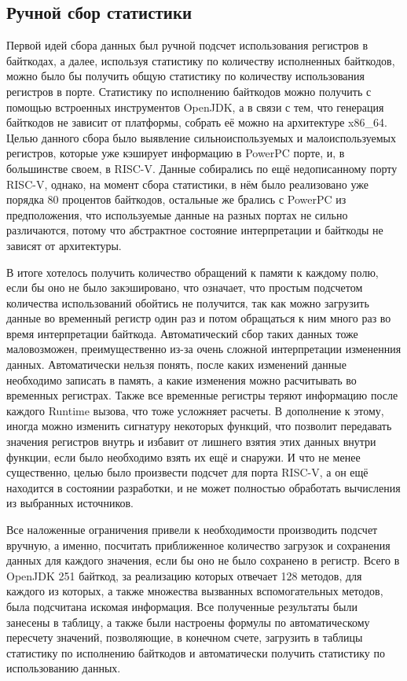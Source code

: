 \subsection{Ручной сбор статистики}

Первой идей сбора данных был ручной подсчет использования регистров в байткодах, а далее, используя статистику по количеству исполненных байткодов, можно было бы получить общую статистику по количеству использования регистров в порте. Статистику по исполнению байткодов можно получить с помощью встроенных инструментов OpenJDK, а в связи с тем, что генерация байткодов не зависит от платформы, собрать её можно на архитектуре x86\_64. Целью данного сбора было выявление сильноиспользуемых и малоиспользуемых регистров, которые уже кэширует информацию в PowerPC порте, и, в большинстве своем, в RISC-V. Данные собирались по ещё недописанному порту RISC-V, однако, на момент сбора статистики, в нём было реализовано уже порядка 80 процентов байткодов, остальные же брались с PowerPC из предположения, что используемые данные на разных портах не сильно различаются, потому что абстрактное состояние интерпретации и байткоды не зависят от архитектуры.

В итоге хотелось получить количество обращений к памяти к каждому полю, если бы оно не было закэшировано, что означает, что простым подсчетом количества использований обойтись не получится, так как можно загрузить данные во временный регистр один раз и потом обращаться к ним много раз во время интерпретации байткода. Автоматический сбор таких данных тоже маловозможен, преимущественно из-за очень сложной интерпретации измененния данных. Автоматически нельзя понять, после каких изменений данные необходимо записать в память, а какие изменения можно расчитывать во временных регистрах. Также все временные регистры теряют информацию после каждого Runtime вызова, что тоже усложняет расчеты. В дополнение к этому, иногда можно изменить сигнатуру некоторых функций, что позволит передавать значения регистров внутрь и избавит от лишнего взятия этих данных внутри функции, если было необходимо взять их ещё и снаружи. И что не менее существенно, целью было произвести подсчет для порта RISC-V, а он ещё находится в состоянии разработки, и не может полностью обработать вычисления из выбранных источников. 

Все наложенные ограничения привели к необходимости производить подсчет вручную, а именно, посчитать приближенное количество загрузок и сохранения данных для каждого значения, если бы оно не было сохранено в регистр. Всего в OpenJDK 251 байткод, за реализацию которых отвечает 128 методов, для каждого из которых, а также множества вызванных вспомогательных методов, была подсчитана искомая информация. Все полученные результаты были занесены в таблицу, а также были настроены формулы по автоматическому пересчету значений, позволяющие, в конечном счете, загрузить в таблицы статистику по исполнению байткодов и автоматически получить статистику по использованию данных.

